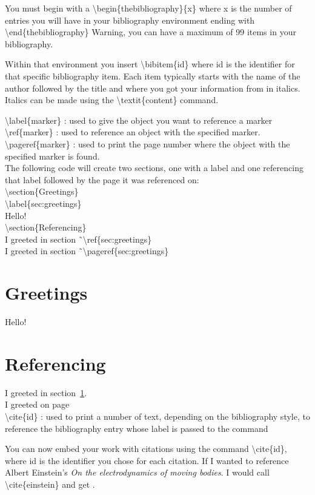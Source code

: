 \documentclass[12pt,journal,compsoc]{IEEEtran}
\begin{document}
You must begin with a \textbackslash{begin\{thebibliography\}\{x\}} where x is the number of entries you will have in your bibliography environment ending with \textbackslash{end\{thebibliography\}} Warning, you can have a maximum of 99 items in your bibliography. \par
Within that environment you insert \textbackslash{bibitem\{id\}} where id is the identifier for that specific bibliography item. Each item typically starts with the name of the author followed by the title and where you got your information from in italics. Italics can be made using the \textbackslash{textit\{content\}} command. \par

\begin{center}
\textbackslash{label\{marker\}} : used to give the object you want to reference a marker\\
\textbackslash{ref\{marker\}} : used to reference an object with the specified marker. \\
\textbackslash{pageref\{marker\}} : used to print the page number where the object with the specified marker is found.\\ 
The following code will create two sections, one with a label and one referencing that label followed by the page it was referenced on: \\ \textbackslash{section\{Greetings\}} \\
\textbackslash{label\{sec:greetings\}} \\
Hello!\\
\textbackslash{section\{Referencing\}} \\
I greeted in section \~\ \textbackslash{ref\{sec:greetings\}} \\
I greeted in section \~\ \textbackslash{pageref\{sec:greetings\}}


\section{Greetings}
\label{sec:greetings}
Hello!
\section{Referencing}
I greeted in section~\ref{sec:greetings}.\\
I greeted on page ~\pageref{sec:greetings} \\

\textbackslash{cite\{id\}} : used to print a number of text, depending on the bibliography style, to reference the bibliography entry whose label is passed to the command 
\end{center}
You can now embed your work with citations using the command \textbackslash{cite\{id\}}, where id is the identifier you chose for each citation. If I wanted to reference Albert Einstein's \textit{On the electrodynamics of moving bodies}. I would call \textbackslash{cite\{einstein\}} and get \cite{einstein}. 
\end{document}

